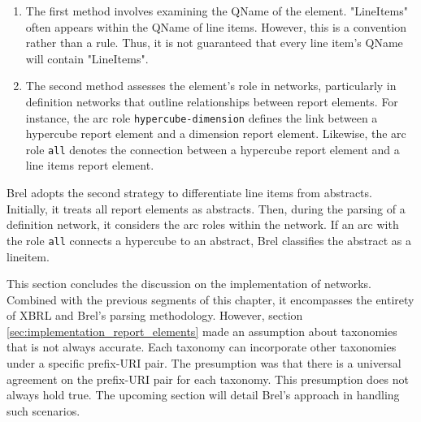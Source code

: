\begin{enumerate}
\item The first method involves examining the QName of the element.
"LineItems" often appears within the QName of line items.
However, this is a convention rather than a rule.
Thus, it is not guaranteed that every line item's QName will contain "LineItems".
\item The second method assesses the element's role in networks, particularly in definition networks that outline relationships between report elements.
For instance, the arc role \texttt{hypercube-dimension} defines the link between a hypercube report element and a dimension report element.
Likewise, the arc role \texttt{all} denotes the connection between a hypercube report element and a line items report element.
\end{enumerate}

Brel adopts the second strategy to differentiate line items from abstracts.
Initially, it treats all report elements as abstracts.
Then, during the parsing of a definition network, it considers the arc roles within the network.
If an arc with the role \texttt{all} connects a hypercube to an abstract, Brel classifies the abstract as a lineitem.

This section concludes the discussion on the implementation of networks.
Combined with the previous segments of this chapter, it encompasses the entirety of XBRL and Brel's parsing methodology.
However, section \ref{sec:implementation_report_elements} made an assumption about taxonomies that is not always accurate.
Each taxonomy can incorporate other taxonomies under a specific prefix-URI pair.
The presumption was that there is a universal agreement on the prefix-URI pair for each taxonomy.
This presumption does not always hold true.
The upcoming section will detail Brel's approach in handling such scenarios.